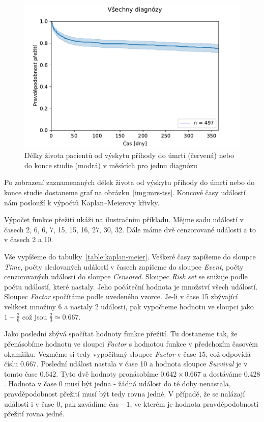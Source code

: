 \begin{figure}[htbp]
    \includegraphics[width=.6\textwidth]{img/image_7.pdf}
    \centering
    \caption{Délky života pacientů od výskytu příhody do úmrtí (červená) nebo do konce studie (modrá) v měsících pro jednu diagnózu}
    \label{img:lifelines}
\end{figure}
\FloatBarrier

Po zobrazení zaznamenaných délek života od výskytu příhody do úmrtí nebo do konce studie dostaneme graf na obrázku~\ref{img:mrs-tss}.
Koncové časy událostí nám poslouží k výpočtů Kaplan–Meierovy křivky.

Výpočet funkce přežití ukáži na ilustračním příkladu.
Mějme sadu událostí v časech 2, 6, 6, 7, 15, 15, 16, 27, 30, 32.
Dále máme dvě cenzorované události a to v časech 2 a 10.

Vše vypíšeme do tabulky~\ref{table:kaplan-meier}.
Veškeré časy zapíšeme do sloupce \textit{Time}, počty sledovaných událostí v časech zapíšeme do sloupce \textit{Event}, počty cenzorovaných událostí do sloupce \textit{Censored}.
Sloupec \textit{Risk set} se snižuje podle počtu událostí, které nastaly.
Jeho počáteční hodnota je množství všech událostí.
Sloupec \textit{Factor} spočítáme podle uvedeného vzorce.
Je-li v čase 15 zbývající velikost množiny 6 a nastaly 2 události, pak vypočteme hodnotu ve sloupci jako \( 1 - \frac{2}{6} \) což jsou \( \frac{2}{3} \simeq 0.667 \).

Jako poslední zbývá spočítat hodnoty funkce přežití.
Tu dostaneme tak, že přenásobíme hodnotu ve sloupci \textit{Factor} s hodnotou funkce v předchozím časovém okamžiku.
Vezměme si tedy vypočítaný sloupec \textit{Factor} v čase 15, což odpovídá číslu \( 0.667 \).
Poslední událost nastala v čase 10 a hodnota sloupce \textit{Survival} je v tomto čase \( 0.642 \).
Tyto dvě hodnoty pronásobíme \( 0.642 \times 0.667 \) a dostáváme \( 0.428 \).
Hodnota v čase 0 musí být jedna - žádná událost do té doby nenastala, pravděpodobnost přežití musí být tedy rovna jedné.
V případě, že se nalázají události i v čase 0, pak zavádíme čas \( -1 \), ve kterém je hodnota pravděpodobnosti přežití rovna jedné.

